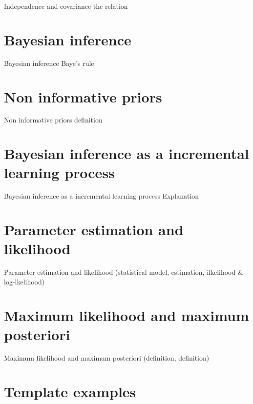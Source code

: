 \documentclass{beamer}
\begin{document}
\begin{frame}{Independence and covariance}
  the relation
\end{frame}

\section{Bayesian inference}

\begin{frame}{Bayesian inference}
  Baye's rule
\end{frame}

\section{Non informative priors}

\begin{frame}{Non informative priors}
  definition
\end{frame}

\section{Bayesian inference as a incremental learning process}

\begin{frame}{Bayesian inference as a incremental learning process}
  Explanation
\end{frame}

\section{Parameter estimation and likelihood}

\begin{frame}{Parameter estimation and likelihood}
  (statistical model, estimation, ilkelihood \& log-lkelihood)
\end{frame}

\section{Maximum likelihood and maximum posteriori}

\begin{frame}{Maximum likelihood and maximum posteriori}
  (definition, definition)
\end{frame}

\section{Template examples}
\end{document}
